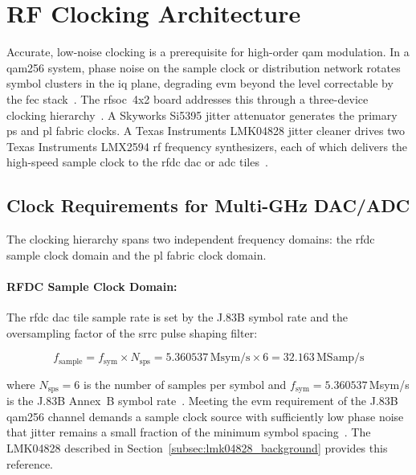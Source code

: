 


\section{RF Clocking Architecture}
\label{sec:rf_clocking_background}

Accurate, low-noise clocking is a prerequisite for high-order
\ac{qam} modulation.
In a \ac{qam256} system, phase noise on the sample clock or
distribution network rotates symbol clusters in the \ac{iq} plane,
degrading \ac{evm} beyond the level correctable by the \ac{fec}
stack~\cite{proakis_dsp}.
The \ac{rfsoc}~4x2 board addresses this through a three-device
clocking hierarchy~\cite{RealDigital_A6}.
A Skyworks Si5395 jitter attenuator generates the primary \ac{ps}
and \ac{pl} fabric clocks.
A Texas Instruments LMK04828 jitter cleaner drives two Texas
Instruments LMX2594 \ac{rf} frequency synthesizers, each of which
delivers the high-speed sample clock to the \ac{rfdc} \ac{dac} or
\ac{adc} tiles~\cite{RealDigital_A6}.


\subsection{Clock Requirements for Multi-GHz DAC/ADC}
\label{subsec:clock_requirements}

The clocking hierarchy spans two independent frequency domains:
the \ac{rfdc} sample clock domain and the \ac{pl} fabric clock domain.

\paragraph{RFDC Sample Clock Domain:}
The \ac{rfdc} \ac{dac} tile sample rate is set by the J.83B symbol
rate and the oversampling factor of the \ac{srrc} pulse shaping filter:

\begin{equation}
  f_\text{sample} = f_\text{sym} \times N_\text{sps}
                  = 5.360537\,\text{Msym/s} \times 6
                  = 32.163\,\text{MSamp/s}
  \label{eq:sample_rate}
\end{equation}

\noindent where $N_\text{sps} = 6$ is the number of samples per symbol
and $f_\text{sym} = 5.360537$\,Msym/s is the J.83B Annex~B symbol
rate~\cite{ITU_J83}.
Meeting the \ac{evm} requirement of the J.83B \ac{qam256} channel
demands a sample clock source with sufficiently low phase noise that
jitter remains a small fraction of the minimum symbol
spacing~\cite{proakis_dsp}.
The LMK04828 described in Section~\ref{subsec:lmk04828_background}
provides this reference.

